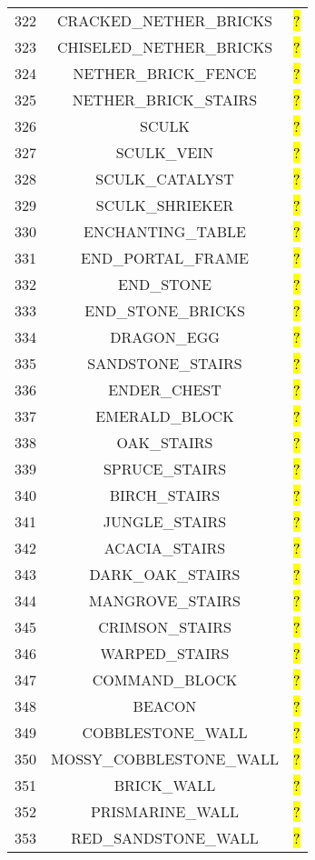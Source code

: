\documentclass[11pt]{article}
\newcommand\myworries[1]{\sethlcolor{red}\hl{#1}}
\begin{document}
\begin{longtable}{ |c|c|c| }
	322 & CRACKED\_NETHER\_BRICKS & \myworries{?} \\
	323 & CHISELED\_NETHER\_BRICKS & \myworries{?} \\
	324 & NETHER\_BRICK\_FENCE & \myworries{?} \\
	325 & NETHER\_BRICK\_STAIRS & \myworries{?} \\
	326 & SCULK & \myworries{?} \\
	327 & SCULK\_VEIN & \myworries{?} \\
	328 & SCULK\_CATALYST & \myworries{?} \\
	329 & SCULK\_SHRIEKER & \myworries{?} \\
	330 & ENCHANTING\_TABLE & \myworries{?} \\
	331 & END\_PORTAL\_FRAME & \myworries{?} \\
	332 & END\_STONE & \myworries{?} \\
	333 & END\_STONE\_BRICKS & \myworries{?} \\
	334 & DRAGON\_EGG & \myworries{?} \\
	335 & SANDSTONE\_STAIRS & \myworries{?} \\
	336 & ENDER\_CHEST & \myworries{?} \\
	337 & EMERALD\_BLOCK & \myworries{?} \\
	338 & OAK\_STAIRS & \myworries{?} \\
	339 & SPRUCE\_STAIRS & \myworries{?} \\
	340 & BIRCH\_STAIRS & \myworries{?} \\
	341 & JUNGLE\_STAIRS & \myworries{?} \\
	342 & ACACIA\_STAIRS & \myworries{?} \\
	343 & DARK\_OAK\_STAIRS & \myworries{?} \\
	344 & MANGROVE\_STAIRS & \myworries{?} \\
	345 & CRIMSON\_STAIRS & \myworries{?} \\
	346 & WARPED\_STAIRS & \myworries{?} \\
	347 & COMMAND\_BLOCK & \myworries{?} \\
	348 & BEACON & \myworries{?} \\
	349 & COBBLESTONE\_WALL & \myworries{?} \\
	350 & MOSSY\_COBBLESTONE\_WALL & \myworries{?} \\
	351 & BRICK\_WALL & \myworries{?} \\
	352 & PRISMARINE\_WALL & \myworries{?} \\
	353 & RED\_SANDSTONE\_WALL & \myworries{?} \\

\end{longtable}
\end{document}
